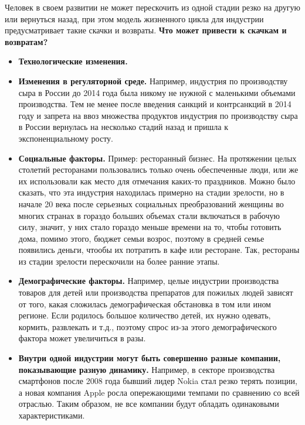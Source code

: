 \documentclass{article}
\begin{document}
	Человек в своем развитии не может перескочить из одной стадии резко на другую или вернуться назад, при этом модель жизненного цикла для индустрии предусматривает такие скачки и возвраты. 
	\textbf{Что может привести к скачкам и возвратам?}
	\begin{itemize}
		\item \textbf{Технологические изменения.}
		\item \textbf{Изменения в регуляторной среде.} Например, индустрия по производству сыра в России до 2014 года была никому не нужной с маленькими объемами производства. Тем не менее после введения санкций и контрсанкций в 2014 году и запрета на ввоз множества продуктов индустрия по производству сыра в России вернулась на несколько стадий назад и пришла к экспоненциальному росту.
		\item \textbf{Социальные факторы.} Пример: ресторанный бизнес. На протяжении целых столетий ресторанами пользовались только очень обеспеченные люди, или же их использовали как место для отмечания каких-то праздников. Можно было сказать, что эта индустрия находилась примерно на стадии зрелости, но в начале 20 века после серьезных социальных преобразований женщины во многих странах в гораздо больших объемах стали включаться в рабочую силу, значит, у них стало гораздо меньше времени на то, чтобы готовить дома, помимо этого, бюджет семьи возрос, поэтому  в средней семье появились деньги, чтообы их потратить в кафе или ресторане. Так, рестораны из стадии зрелости перескочили на более ранние этапы.
		\item \textbf{Демографические факторы.} Например, целые индустрии производства товаров для детей или производства препаратов для пожилых людей зависят от того, какая сложилась демографическая обстановка в том или ином регионе. Если родилось большое количество детей, их нужно одевать, кормить, развлекать и т.д., поэтому спрос из-за этого демографического фактора может увеличиться в разы.
		\item \textbf{Внутри одной индустрии могут быть совершенно разные компании, показывающие разную динамику.} Например, в секторе производства смартфонов после 2008 года бывший лидер Nokia стал резко терять позиции, а новая компания Apple росла опережающими темпами по сравнению со всей отраслью. Таким образом, не все компании будут обладать одинаковыми характеристиками.
	\end{itemize}
	
	
\end{document}
